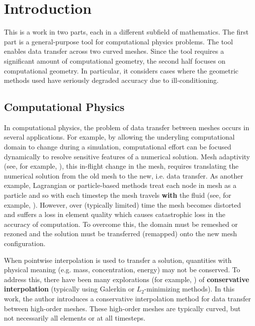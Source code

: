 \chapter{Introduction}

This is a work in two parts, each in a different subfield of mathematics.
The first part is a general-purpose tool for computational physics problems.
The tool enables data transfer across two curved meshes.
Since the tool requires a significant amount of computational geometry, the
second half focuses on computational geometry. In particular, it considers
cases where the geometric methods used have seriously degraded accuracy due to
ill-conditioning.

\section{Computational Physics}

In computational physics, the problem of data transfer between meshes
occurs in several applications. For example, by allowing the underyling
computational domain to change during a simulation, computational
effort can be focused dynamically to resolve sensitive features
of a numerical solution. Mesh adaptivity (see, for example,
\cite{Dukowicz1987, Babuska1978}), this in-flight change in the mesh,
requires translating the numerical solution from the old mesh to the new,
i.e. data transfer. As another example, Lagrangian or particle-based methods
treat each node in mesh as a particle and so with each timestep the mesh
travels \textbf{with} the fluid (see, for example, \cite{Hirt1974}).
However, over (typically limited) time the mesh
becomes distorted and suffers a loss in element quality which causes
catastrophic loss in the accuracy of computation. To overcome this, the
domain must be remeshed or rezoned and the solution must be
transferred (remapped) onto the new mesh configuration.

When pointwise interpolation is used to transfer a solution, quantities with
physical meaning (e.g. mass, concentration, energy) may not be conserved.
To address this, there have been many explorations (for example,
\cite{Jiao2004, Farrell2009, Farrell2011}) of
\textbf{conservative interpolation} (typically using Galerkin or
\(L_2\)-minimizing methods). In this work, the author introduces a
conservative interpolation method for data transfer between high-order
meshes. These high-order meshes are typically curved, but not necessarily
all elements or at all timesteps.

